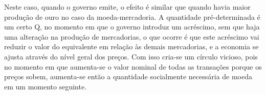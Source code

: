 Neste caso, quando o governo emite, o efeito é similar  que quando havia maior produção de ouro no caso da moeda-mercadoria. A quantidade pré-determinada é um certo Q, no momento em que o governo introduz um acréscimo, sem que haja uma alteração na produção de mercadorias, o que ocorre é que este acréscimo vai reduzir o valor do equivalente em relação às demais mercadorias, e a economia se ajusta através do nível geral dos preços. Com isso cria-se um círculo vicioso, pois no momento  em que aumenta-se o valor nominal de todas as transações porque os preços sobem, aumenta-se então a quantidade socialmente necessária de moeda em um momento seguinte.